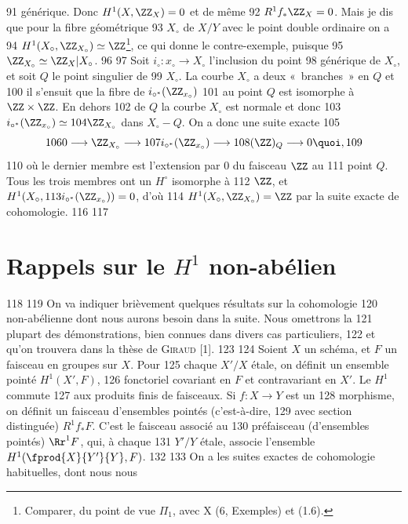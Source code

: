     91	générique. Donc $H^1(X,\ZZ_X)=0$ et de même
    92	$R^1f_{\ast}\ZZ_X=0$. Mais je dis que pour la fibre géométrique
    93	$X_{\circ}$ de $X/Y$ avec le point double ordinaire on a
    94	$H^1(X_{\circ},\ZZ_{X_{\circ}})\simeq \ZZ$\footnote[1]{Comparer, du point de vue $\Pi_1$, avec  X (6, Exemples) et (1.6).}, ce qui donne le contre-exemple, puisque
    95	$\ZZ_{X_{\circ}}\simeq \ZZ_X| X_{\circ}$.
    96	
    97	Soit $i_{\circ}:x_{\circ}\rightarrow X_{\circ}$ l'inclusion du point
    98	générique de $X_{\circ}$, et soit $Q$ le point singulier de
    99	$X_{\circ}$. La courbe $X_{\circ}$ a deux « branches »  en $Q$ et
   100	il s'ensuit que la fibre de $i_{\circ^{\ast}}(\ZZ_{x_{\circ}})$
   101	au point $Q$ est isomorphe à $\ZZ\times \ZZ$. En dehors
   102	de $Q$ la courbe $X_{\circ}$ est normale et donc
   103	$i_{\circ^{\ast}}(\ZZ_{x_{\circ}})\simeq
   104	\ZZ_{X_{\circ}}$ dans $X_{\circ}-Q$. On a donc une suite exacte
   105	$$
   106	0\longrightarrow \ZZ_{X_{\circ}}\longrightarrow
   107	i_{\circ^{\ast}}(\ZZ_{x_{\circ}})\longrightarrow
   108	(\ZZ)_Q\longrightarrow 0{\quoi},
   109	$$
   110	où le dernier membre est l'extension par $0$ du faisceau $\ZZ$ au
   111	point $Q$. Tous les trois membres ont un $H^{\circ}$ isomorphe à
   112	$\ZZ$, et $H^1(X_{\circ},
   113	i_{\circ^{\ast}}(\ZZ_{x_{\circ}}))=0$, d'où
   114	$H^1(X_{\circ},\ZZ_{X_{\circ}})=\ZZ$	par la suite exacte de cohomologie.
   116	
   117	\section{Rappels sur le $H^1$ non-abélien}
   118	
   119	On va indiquer brièvement quelques résultats sur la cohomologie
   120	non-abélienne dont nous aurons besoin dans la suite. Nous omettrons la
   121	plupart des démonstrations, bien connues dans divers cas particuliers,
   122	et qu'on trouvera dans la thèse de \textsc{Giraud} [1].
   123	
   124	Soient $X$ un schéma, et $F$ un faisceau en groupes sur $X$. Pour
   125	chaque $X'/X$ étale, on définit un ensemble pointé $H^1(X',F)$,
   126	fonctoriel covariant en $F$ et contravariant en $X'$. Le $H^1$ commute
   127	aux produits finis de faisceaux. Si $f:X\rightarrow Y$ est un
   128	morphisme, on définit un faisceau d'ensembles pointés (c'est-à-dire,
   129	avec section distinguée) $R^1f_{\ast}F$. C'est le faisceau associé au
   130	préfaisceau (d'ensembles pointés) $\Rr^1F$, qui, à chaque
   131	$Y'/Y$ étale, associe l'ensemble $H^1(\fprod{X}{Y'}{Y},F)$.
   132	
   133	On a les suites exactes de cohomologie habituelles, dont nous nous
